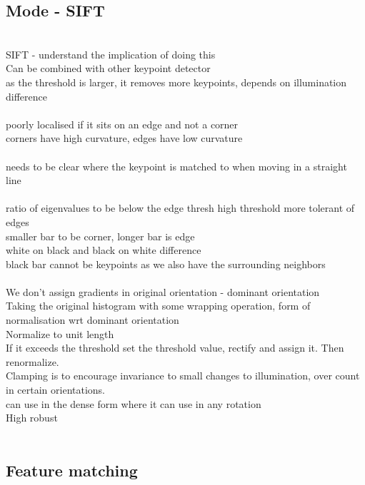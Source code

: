 \documentclass[11pt]{article}
\begin{document}
\subsection*{Mode - SIFT}\\
SIFT - understand the implication of doing this\\
Can be combined with other keypoint detector
\\
as the threshold is larger, it removes more keypoints, depends on illumination difference\\
\\
poorly localised if it sits on an edge and not a corner\\
corners have high curvature, edges have low curvature\\
\\
needs to be clear where the keypoint is matched to when moving in a straight line\\
\\
ratio of eigenvalues to be below the edge thresh
high threshold more tolerant of edges\\
smaller bar to be corner, longer bar is edge\\
white on black and black on white difference\\
black bar cannot be keypoints as we also have the surrounding neighbors\\
\\
We don't assign gradients in original orientation - dominant orientation
\\
Taking the original histogram with some wrapping operation, form of normalisation wrt dominant orientation\\
Normalize to unit length\\
If it exceeds the threshold set the threshold value, rectify and assign it. Then renormalize.\\
Clamping is to encourage invariance to small changes to illumination, over count in certain orientations.
\\
can use in the dense form where it can use in any rotation \\
High robust
\\
\\
\subsection*{Feature matching}
\end{document}
